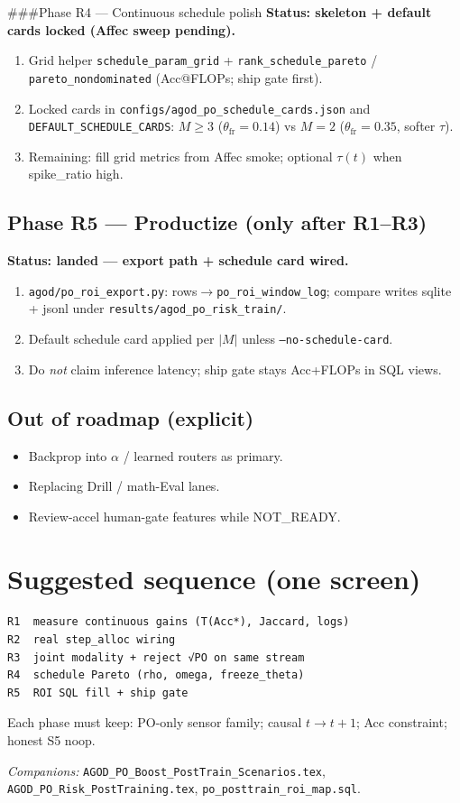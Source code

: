 \documentclass[11pt]{article}
\begin{document}
###{Phase R4 --- Continuous schedule polish}
\textbf{Status: skeleton + default cards locked (Affec sweep pending).}
\begin{enumerate}[leftmargin=1.2em,itemsep=1pt]
  \item Grid helper \texttt{schedule\_param\_grid} +
        \texttt{rank\_schedule\_pareto} / \texttt{pareto\_nondominated}
        (Acc@FLOPs; ship gate first).
  \item Locked cards in \texttt{configs/agod\_po\_schedule\_cards.json}
        and \texttt{DEFAULT\_SCHEDULE\_CARDS}:
        $M\ge3$ ($\theta_{\mathrm{fr}}{=}0.14$) vs $M{=}2$
        ($\theta_{\mathrm{fr}}{=}0.35$, softer $\tau$).
  \item Remaining: fill grid metrics from Affec smoke; optional
        $\tau(t)$ when spike\_ratio high.
\end{enumerate}

\subsection{Phase R5 --- Productize (only after R1--R3)}
\textbf{Status: landed --- export path + schedule card wired.}
\begin{enumerate}[leftmargin=1.2em,itemsep=1pt]
  \item \texttt{agod/po\_roi\_export.py}: rows$\to$\texttt{po\_roi\_window\_log};
        compare writes sqlite + jsonl under \texttt{results/agod\_po\_risk\_train/}.
  \item Default schedule card applied per $|M|$ unless
        \texttt{--no-schedule-card}.
  \item Do \emph{not} claim inference latency; ship gate stays Acc+FLOPs
        in SQL views.
\end{enumerate}

\subsection{Out of roadmap (explicit)}
\begin{itemize}[leftmargin=1.2em,itemsep=1pt]
  \item Backprop into $\alpha$ / learned routers as primary.
  \item Replacing Drill / math-Eval lanes.
  \item Review-accel human-gate features while NOT\_READY.
\end{itemize}

\section{Suggested sequence (one screen)}
\begin{verbatim}
R1  measure continuous gains (T(Acc*), Jaccard, logs)
R2  real step_alloc wiring
R3  joint modality + reject √PO on same stream
R4  schedule Pareto (rho, omega, freeze_theta)
R5  ROI SQL fill + ship gate
\end{verbatim}
Each phase must keep: PO-only sensor family; causal $t\to t{+}1$;
Acc constraint; honest S5 noop.

\vspace{0.6em}
\noindent\textit{Companions:}
\texttt{AGOD\_PO\_Boost\_PostTrain\_Scenarios.tex},
\texttt{AGOD\_PO\_Risk\_PostTraining.tex},
\texttt{po\_posttrain\_roi\_map.sql}.
\end{document}
